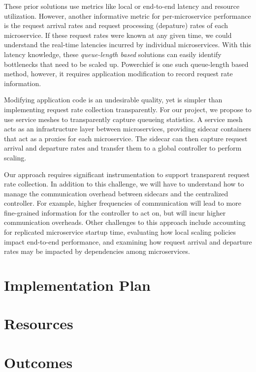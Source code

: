 \documentclass{proposal}
\begin{document}
These prior solutions use metrics like local or end-to-end latency and resource utilization. However, another informative metric for per-microservice performance is the request arrival rates and request processing (depature) rates of each microservice. If these request rates were known at any given time, we could understand the real-time latencies incurred by individual microservices. With this latency knowledge, these \textit{queue-length based} solutions can easily identify bottlenecks that need to be scaled up. Powerchief is one such queue-length based method, however, it requires application modification to record request rate information.

Modifying application code is an undesirable quality, yet is simpler than implementing request rate collection transparently. For our project, we propose to use service meshes to transparently capture queueing statistics. A service mesh acts as an infrastructure layer between microservices, providing sidecar containers that act as a proxies for each microservice. The sidecar can then capture request arrival and departure rates and transfer them to a global controller to perform scaling.

Our approach requires significant instrumentation to support transparent request rate collection. In addition to this challenge, we will have to understand how to manage the communication overhead between sidecars and the centralized controller. For example, higher frequencies of communication will lead to more fine-grained information for the controller to act on, but will incur higher communication overheads.
Other challenges to this approach include accounting for replicated microservice startup time, evaluating how local scaling policies impact end-to-end performance, and examining how request arrival and departure rates may be impacted by dependencies among microservices.

\section{Implementation Plan}

\section{Resources}

\section{Outcomes}

 
\begin{small}

\end{small}
\end{document}
